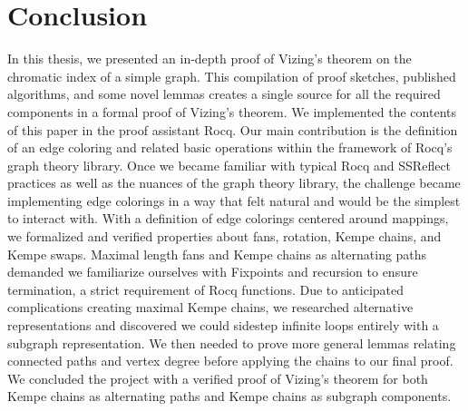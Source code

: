 \chapter{Conclusion}
In this thesis, we presented an in-depth proof of Vizing's theorem on the chromatic index of a simple graph. This compilation of proof sketches, published algorithms, and some novel lemmas creates a single source for all the required components in a formal proof of Vizing's theorem. We implemented the contents of this paper in the proof assistant Rocq. Our main contribution is the definition of an edge coloring and related basic operations within the framework of Rocq's graph theory library. Once we became familiar with typical Rocq and SSReflect practices as well as the nuances of the graph theory library, the challenge became implementing edge colorings in a way that felt natural and would be the simplest to interact with. With a definition of edge colorings centered around mappings, we formalized and verified properties about fans, rotation, Kempe chains, and Kempe swaps. Maximal length fans and Kempe chains as alternating paths demanded we familiarize ourselves with Fixpoints and recursion to ensure termination, a strict requirement of Rocq functions. Due to anticipated complications creating maximal Kempe chains, we researched alternative representations and discovered we could sidestep infinite loops entirely with a subgraph representation. We then needed to prove more general lemmas relating connected paths and vertex degree before applying the chains to our final proof. We concluded the project with a verified proof of Vizing's theorem for both Kempe chains as alternating paths and Kempe chains as subgraph components. 

